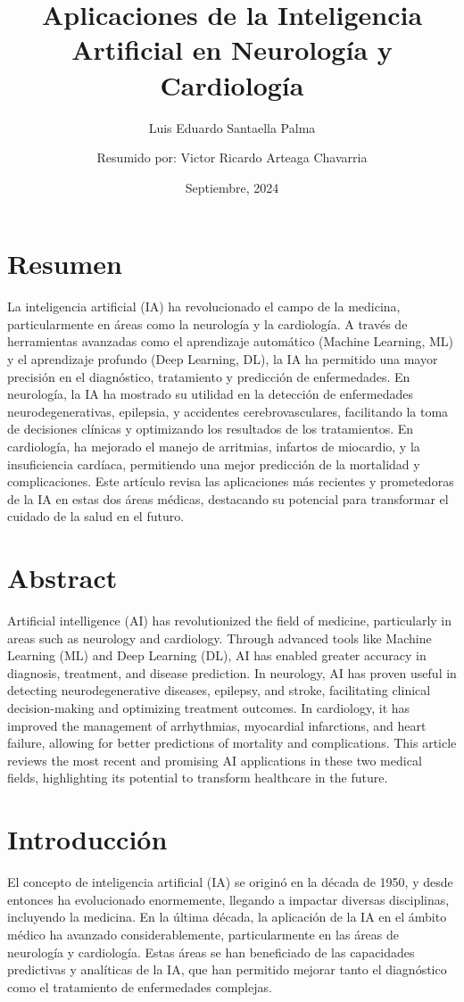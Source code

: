 \documentclass{article}
\title{ Aplicaciones de la Inteligencia Artificial en Neurología y Cardiología}
\author{Luis Eduardo Santaella Palma}
\author{Resumido por: Victor Ricardo Arteaga Chavarria}
\date{Septiembre, 2024}
\begin{document}
\maketitle

\tableofcontents
\newpage

\section{Resumen}
La inteligencia artificial (IA) ha revolucionado el campo de la medicina, particularmente en áreas como la neurología y la cardiología. A través de herramientas avanzadas como el aprendizaje automático (Machine Learning, ML) y el aprendizaje profundo (Deep Learning, DL), la IA ha permitido una mayor precisión en el diagnóstico, tratamiento y predicción de enfermedades. En neurología, la IA ha mostrado su utilidad en la detección de enfermedades neurodegenerativas, epilepsia, y accidentes cerebrovasculares, facilitando la toma de decisiones clínicas y optimizando los resultados de los tratamientos. En cardiología, ha mejorado el manejo de arritmias, infartos de miocardio, y la insuficiencia cardíaca, permitiendo una mejor predicción de la mortalidad y complicaciones. Este artículo revisa las aplicaciones más recientes y prometedoras de la IA en estas dos áreas médicas, destacando su potencial para transformar el cuidado de la salud en el futuro.

\section{Abstract}
Artificial intelligence (AI) has revolutionized the field of medicine, particularly in areas such as neurology and cardiology. Through advanced tools like Machine Learning (ML) and Deep Learning (DL), AI has enabled greater accuracy in diagnosis, treatment, and disease prediction. In neurology, AI has proven useful in detecting neurodegenerative diseases, epilepsy, and stroke, facilitating clinical decision-making and optimizing treatment outcomes. In cardiology, it has improved the management of arrhythmias, myocardial infarctions, and heart failure, allowing for better predictions of mortality and complications. This article reviews the most recent and promising AI applications in these two medical fields, highlighting its potential to transform healthcare in the future.

\section{Introducción}
El concepto de inteligencia artificial (IA) se originó en la década de 1950, y desde entonces ha evolucionado enormemente, llegando a impactar diversas disciplinas, incluyendo la medicina. En la última década, la aplicación de la IA en el ámbito médico ha avanzado considerablemente, particularmente en las áreas de neurología y cardiología. Estas áreas se han beneficiado de las capacidades predictivas y analíticas de la IA, que han permitido mejorar tanto el diagnóstico como el tratamiento de enfermedades complejas.
\end{document}
